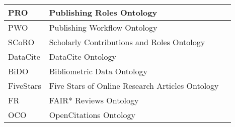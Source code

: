 \begin{table}[]
\begin{tabular}{llr}
PRO           & Publishing Roles Ontology & \cite{DBLP:conf/i-semantics/PeroniSV12}                            \\ \midrule
PWO           & Publishing Workflow Ontology & \cite{DBLP:journals/semweb/GangemiPSV17}                        \\ \midrule
SCoRO         & Scholarly Contributions and Roles Ontology & \cite{Scoro}                                      \\ \midrule
DataCite      & DataCite Ontology & \cite{DataCite_Ontology}                                                   \\ \midrule
BiDO          & Bibliometric Data Ontology & \cite{tapia2019extension}                                         \\ \midrule
FiveStars     & Five Stars of Online Research Articles Ontology & \cite{DBLP:journals/dlib/Shotton12}          \\ \midrule
FR            & FAIR* Reviews Ontology & \cite{Fair}                                                           \\ \midrule
OCO           & OpenCitations Ontology & \cite{DBLP:journals/qss/PeroniS20}

\\ \bottomrule

\end{tabular}
\end{table}
